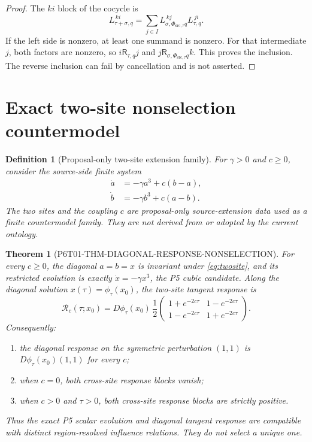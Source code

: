 \documentclass[11pt]{article}
\newtheorem{definition}{Definition}
\newtheorem{theorem}{Theorem}
\newcommand{\Rel}{\mathsf R}
\begin{document}
\begin{proof}
The \(ki\) block of the cocycle is
\[
 L_{\tau+\sigma,q}^{\,ki}
 =\sum_{j\in I}
 L_{\sigma,\Phi_{\mathrm{src},\tau}q}^{\,kj}
 L_{\tau,q}^{\,ji}.
\]
If the left side is nonzero, at least one summand is nonzero.  For that
intermediate \(j\), both factors are nonzero, so
\(i\Rel_{\tau,q}j\) and
 \(j\Rel_{\sigma,\Phi_{\mathrm{src},\tau}q}k\).  This proves the inclusion.  The reverse
inclusion can fail by cancellation and is not asserted.
\end{proof}

\section{Exact two-site nonselection countermodel}

\begin{definition}[Proposal-only two-site extension family]
\label{def:twosite}
For \(\gamma>0\) and \(c\geq0\), consider the source-side finite system
\[
\begin{aligned}
 \dot a&=-\gamma a^3+c(b-a),\\
 \dot b&=-\gamma b^3+c(a-b).
\end{aligned}
\tag{1}\label{eq:twosite}
\]
The two sites and the coupling \(c\) are proposal-only source-extension data
used as a finite countermodel family.  They are not derived from or adopted
by the current ontology.
\end{definition}

\begin{theorem}[P6T01-THM-DIAGONAL-RESPONSE-NONSELECTION]
\label{thm:nonselection}
For every \(c\geq0\), the diagonal \(a=b=x\) is invariant under
\eqref{eq:twosite}, and its restricted evolution is exactly
\(\dot x=-\gamma x^3\), the P5 cubic candidate.  Along the diagonal solution
\(x(\tau)=\phi_\tau(x_0)\), the two-site tangent response is
\[
 \mathcal R_c(\tau;x_0)
 =
 D\phi_\tau(x_0)\,
 \frac12
 \begin{pmatrix}
  1+e^{-2c\tau} & 1-e^{-2c\tau}\\
  1-e^{-2c\tau} & 1+e^{-2c\tau}
 \end{pmatrix}.
\tag{2}\label{eq:response}
\]
Consequently:
\begin{enumerate}
  \item the diagonal response on the symmetric perturbation \((1,1)\) is
  \(D\phi_\tau(x_0)(1,1)\) for every \(c\);
  \item when \(c=0\), both cross-site response blocks vanish;
  \item when \(c>0\) and \(\tau>0\), both cross-site response blocks are
  strictly positive.
\end{enumerate}
Thus the exact P5 scalar evolution and diagonal tangent response are
compatible with distinct region-resolved influence relations.  They do not
select a unique one.
\end{theorem}
\end{document}
